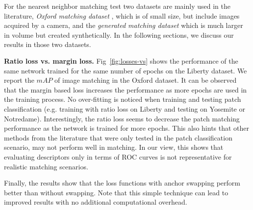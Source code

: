 For the nearest neighbor matching test two datasets are mainly used in
the literature, {\em Oxford matching dataset}
\cite{schmid2003performance}, which is of small size, but include
images acquired by a camera, and the {\em generated matching dataset}
\cite{FDB14} which is much larger in volume but created
synthetically. In the following sections, we discuss our results in
those two datasets.

\textbf{Ratio loss vs. margin loss.} Fig~\ref{fig:losses-vs} shows the performance of the same
network trained for the same number of epochs on the Liberty
dataset. We report the $mAP$  of image matching
in the Oxford dataset. It can be observed that the margin based loss
increases the performance as more epochs are used in the training
process. No over-fitting is noticed when training and testing patch classification (e.g. training with ratio loss on
Liberty and testing on Yosemite or Notredame). Interestingly, the ratio loss seems to decrease the patch
matching performance as the network is trained for more epochs.  
This also hints that other methods from the literature that were only tested in the patch
classification scenario, may not perform well in matching. In our view, this shows that evaluating descriptors only in
terms of ROC curves is not representative for
realistic matching scenarios. 

Finally, the results show that the loss functions with anchor swapping
perform better than without swapping. Note that this simple technique
can lead to improved results with no additional computational
overhead.

